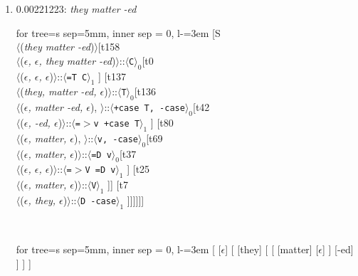 \documentclass[11pt]{article}
\begin{document}
\begin{enumerate}
	\item  0.00221223: \textit{they matter -ed} \\[0.5em]
	\begin{adjustbox}{max width = \textwidth}
	\begin{forest}
	for tree={s sep=5mm, inner sep = 0, l-=3em}
	[S\\$\langle$(\textit{they matter -ed})$\rangle$[t158\\$\langle$(\textit{$\epsilon${,} $\epsilon${,} they matter -ed})$\rangle$::$\langle$\texttt{C}$\rangle_0$[t0\\$\langle$(\textit{$\epsilon${,} $\epsilon${,} $\epsilon$})$\rangle$::$\langle$\texttt{{=}T C}$\rangle_1$ ] [t137\\$\langle$(\textit{they{,} matter -ed{,} $\epsilon$})$\rangle$::$\langle$\texttt{T}$\rangle_0$[t136\\$\langle$(\textit{$\epsilon${,} matter -ed{,} $\epsilon$}){,} $\rangle$::$\langle$\texttt{+case T{,} -case}$\rangle_0$[t42\\$\langle$(\textit{$\epsilon${,} -ed{,} $\epsilon$})$\rangle$::$\langle$\texttt{{=}$>$v +case T}$\rangle_1$ ] [t80\\$\langle$(\textit{$\epsilon${,} matter{,} $\epsilon$}){,} $\rangle$::$\langle$\texttt{v{,} -case}$\rangle_0$[t69\\$\langle$(\textit{$\epsilon${,} matter{,} $\epsilon$})$\rangle$::$\langle$\texttt{{=}D v}$\rangle_0$[t37\\$\langle$(\textit{$\epsilon${,} $\epsilon${,} $\epsilon$})$\rangle$::$\langle$\texttt{{=}$>$V {=}D v}$\rangle_1$ ] [t25\\$\langle$(\textit{$\epsilon${,} matter{,} $\epsilon$})$\rangle$::$\langle$\texttt{V}$\rangle_1$ ]] [t7\\$\langle$(\textit{$\epsilon${,} they{,} $\epsilon$})$\rangle$::$\langle$\texttt{D -case}$\rangle_1$ ]]]]]]
	\end{forest}
	\end{adjustbox}
	\\
	\begin{adjustbox}{max width = \textwidth}
	\begin{forest}
	for tree={s sep=5mm, inner sep = 0, l-=3em}
	[ [$\epsilon$] [ [they] [ [ [matter] [$\epsilon$] ] [-ed] ] ] ]
	\end{forest}
	\end{adjustbox}
	\newpage


\end{enumerate}
\end{document}
